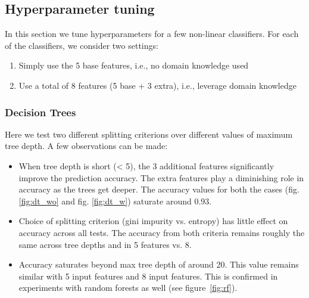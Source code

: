 \documentclass{article}
\begin{document}
\subsection{Hyperparameter tuning}
\label{sec:tuning}
In this section we tune hyperparameters for a few non-linear classifiers. For each of the classifiers, we consider two settings:
\begin{enumerate} 
\item Simply use the 5 base features, i.e., no domain knowledge used
\item Use a total of 8 features (5 base + 3 extra), i.e., leverage domain knowledge
\end{enumerate}

\subsubsection{Decision Trees}
Here we test two different splitting criterions over different values of maximum tree depth. A few observations can be made:
\begin{itemize}
\item When tree depth is short (< 5), the 3 additional features significantly improve the prediction accuracy. The extra features play a diminishing role in accuracy as the trees get deeper. The accuracy values for both the cases (fig. \ref{fig:dt_wo} and fig. \ref{fig:dt_w}) saturate around 0.93.
\item Choice of splitting criterion (gini impurity vs. entropy) has little effect on accuracy across all tests. The accuracy from both criteria remains roughly the same across tree depths and in 5 features vs. 8.
\item Accuracy saturates beyond max tree depth of around 20. This value remains similar with 5 input features and 8 input features. This is confirmed in experiments with random forests as well (see figure~\ref{fig:rf}).
\end{itemize}
\end{document}
